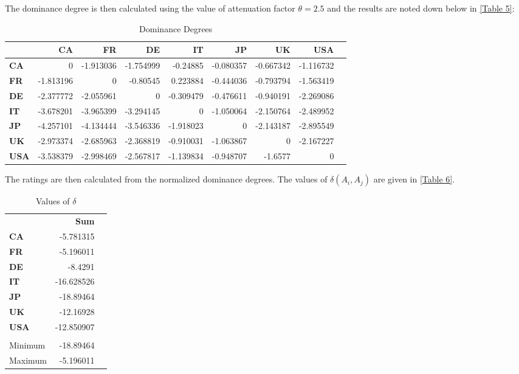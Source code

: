 \documentclass{infor}
\theoremstyle{remark}
\begin{document}
\begin{steps}
The dominance degree is then calculated using the value
of attenuation factor \(\theta = 2.5\) and the results are noted down
below in \autoref{Table 5}:

\begin{table}[!htp]\centering
\caption{Dominance Degrees}\label{Table 5}
\scriptsize
\begin{tabular}{lrrrrrrrr}\toprule
\textbf{} &\textbf{CA} &\textbf{FR} &\textbf{DE} &\textbf{IT} &\textbf{JP} &\textbf{UK} &\textbf{USA} \\\toprule
\textbf{CA} &0 &-1.913036 &-1.754999 &-0.24885 &-0.080357 &-0.667342 &-1.116732 \\
\textbf{FR} &-1.813196 &0 &-0.80545 &0.223884 &-0.444036 &-0.793794 &-1.563419 \\
\textbf{DE} &-2.377772 &-2.055961 &0 &-0.309479 &-0.476611 &-0.940191 &-2.269086 \\
\textbf{IT} &-3.678201 &-3.965399 &-3.294145 &0 &-1.050064 &-2.150764 &-2.489952 \\
\textbf{JP} &-4.257101 &-4.134444 &-3.546336 &-1.918023 &0 &-2.143187 &-2.895549 \\
\textbf{UK} &-2.973374 &-2.685963 &-2.368819 &-0.910031 &-1.063867 &0 &-2.167227 \\
\textbf{USA} &-3.538379 &-2.998469 &-2.567817 &-1.139834 &-0.948707 &-1.6577 &0 \\
\bottomrule
\end{tabular}
\end{table}

\item The ratings are then calculated from the normalized
dominance degrees. The values of \(\delta\left( A_{i},A_{j} \right)\)
are given in \autoref{Table 6}.

\begin{table}[!htp]\centering
\caption{Values of \(\delta \)}\label{Table 6} 
\scriptsize
\begin{tabular}{lrr}\toprule
\textbf{} &\textbf{Sum} \\ \cmidrule{1-2}
\textbf{CA} &-5.781315 \\
\textbf{FR} &-5.196011 \\
\textbf{DE} &-8.4291 \\
\textbf{IT} &-16.628526 \\
\textbf{JP} &-18.89464 \\
\textbf{UK} &-12.16928 \\
\textbf{USA} &-12.850907 \\
& \\\cmidrule{1-2}
Minimum &-18.89464 \\
Maximum &-5.196011 \\
\bottomrule
\end{tabular}
\end{table}


\end{steps}
\end{document}
